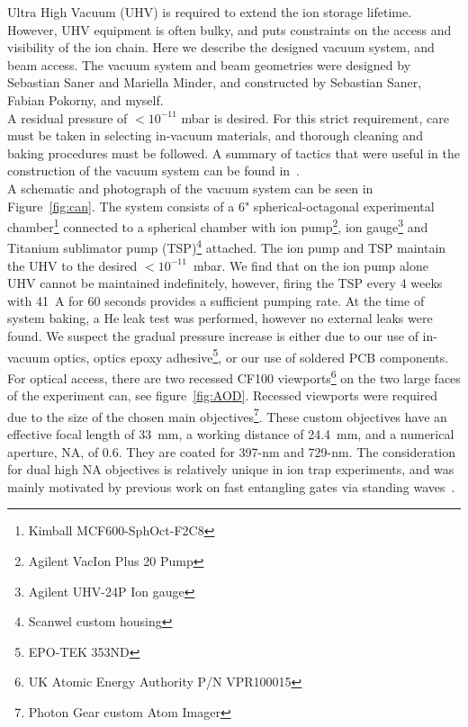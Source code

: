     Ultra High Vacuum (UHV) is required to extend the ion storage lifetime.
    However, UHV equipment is often bulky, and puts constraints on the access
    and visibility of the ion chain. Here we describe the designed vacuum
    system, and beam access.  The vacuum system and beam geometries were
    designed by Sebastian Saner and Mariella Minder, and constructed by
    Sebastian Saner, Fabian Pokorny, and myself.\\
    A residual pressure of $<10^{-11}$ mbar is desired. For this strict
    requirement, care must be taken in selecting in-vacuum materials, and 
    thorough cleaning and baking procedures must be followed. A summary of tactics that were
    useful in the construction of the vacuum system can be found
    in~\cite{birnbaum2005ultra-high, wolf2019cryogenic}.\\
    A schematic and photograph of the vacuum system can be seen in
    Figure~\ref{fig:can}. The system consists of a 6" spherical-octagonal
    experimental chamber\footnote{Kimball MCF600-SphOct-F2C8} connected to a
    spherical chamber with ion pump\footnote{Agilent VacIon Plus 20 Pump}, ion
    gauge\footnote{Agilent UHV-24P Ion gauge} and Titanium sublimator pump
    (TSP)\footnote{Scanwel custom housing} attached. The ion pump and TSP
    maintain the UHV to the desired $<10^{-11}$~mbar. We find that on the ion
    pump alone UHV cannot be maintained indefinitely, however, firing the TSP
    every 4 weeks with 41~A for 60 seconds provides a sufficient pumping rate.
    At the time of system baking, a He leak test was performed, however 
    no external leaks were found. We suspect the gradual pressure increase is either due
    to our use of in-vacuum optics, optics epoxy adhesive\footnote{EPO-TEK
    353ND}, or our use of soldered PCB components.\\
    For optical access, there are two recessed CF100 viewports\footnote{UK Atomic
    Energy Authority P/N VPR100015} on the two large faces of the experiment
    can, see figure~\ref{fig:AOD}. Recessed viewports were required due to the size of the chosen main
    objectives\footnote{Photon Gear custom Atom Imager}. These custom objectives
    have an effective focal length of 33~mm, a working distance of 24.4~mm, and
    a numerical aperture, NA, of 0.6. They are coated for 397-nm and 729-nm.
    The consideration for dual high NA objectives is relatively unique in ion trap experiments, and was mainly motivated by previous work on fast entangling gates via standing waves~\cite{saner2023breaking}. \\
